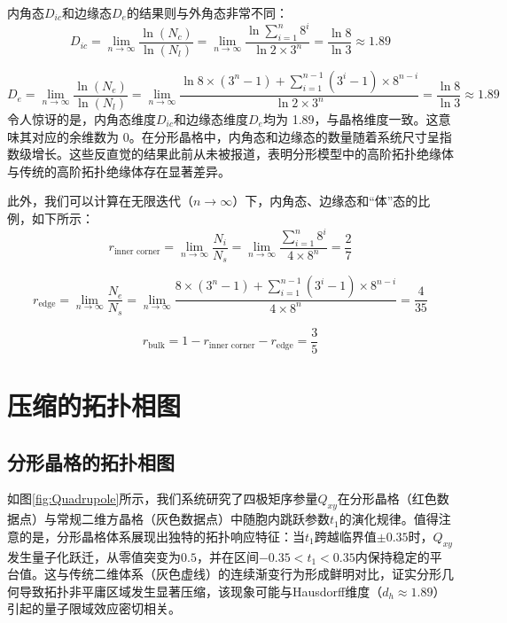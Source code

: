 内角态$D_{ic}$和边缘态$D_e$的结果则与外角态非常不同：
\begin{equation}
D_{ic}= \lim_{n \to \infty} \frac{\ln (N_c)}{\ln (N_l)} = \lim_{n \to \infty} \frac{\ln \sum_{i=1}^{n} 8^i}{\ln 2 \times 3^n} = \frac{\ln 8}{\ln 3} \approx 1.89
\end{equation}

\begin{equation}
D_e = \lim_{n \to \infty} \frac{\ln (N_e)}{\ln (N_l)} = \lim_{n \to \infty} \frac{\ln 8 \times (3^n - 1) + \sum_{i=1}^{n-1} (3^i - 1) \times 8^{n-i}}{\ln 2 \times 3^n} = \frac{\ln 8}{\ln 3} \approx 1.89
\end{equation}
令人惊讶的是，内角态维度$D_{ic}$和边缘态维度$D_e$均为 1.89，与晶格维度一致。这意味其对应的余维数为 0。在分形晶格中，内角态和边缘态的数量随着系统尺寸呈指数级增长。这些反直觉的结果此前从未被报道，表明分形模型中的高阶拓扑绝缘体与传统的高阶拓扑绝缘体存在显著差异。

此外，我们可以计算在无限迭代（\( n \to \infty \)）下，内角态、边缘态和“体”态的比例，如下所示：
\begin{equation}
r_{\text{inner corner}} = \lim_{n \to \infty} \frac{N_i}{N_s} = \lim_{n \to \infty} \frac{\sum_{i=1}^{n} 8^i}{4 \times 8^n} = \frac{2}{7}
\end{equation}

\begin{equation}
r_{\text{edge}} = \lim_{n \to \infty} \frac{N_e}{N_s} = \lim_{n \to \infty} \frac{8 \times (3^n - 1) + \sum_{i=1}^{n-1} (3^i - 1) \times 8^{n-i}}{4 \times 8^n} = \frac{4}{35}
\end{equation}

\begin{equation}
r_{\text{bulk}} = 1 - r_{\text{inner corner}} - r_{\text{edge}} = \frac{3}{5}
\end{equation}

\section{压缩的拓扑相图}
\subsection{分形晶格的拓扑相图}
如图\ref{fig:Quadrupole}所示，我们系统研究了四极矩序参量$Q_{xy}$在分形晶格（红色数据点）与常规二维方晶格（灰色数据点）中随胞内跳跃参数$t_1$的演化规律。值得注意的是，分形晶格体系展现出独特的拓扑响应特征：当$t_1$跨越临界值$\pm 0.35$时，$Q_{xy}$发生量子化跃迁，从零值突变为$0.5$，并在区间$-0.35 < t_1 < 0.35$内保持稳定的平台值。这与传统二维体系（灰色虚线）的连续渐变行为形成鲜明对比，证实分形几何导致拓扑非平庸区域发生显著压缩，该现象可能与Hausdorff维度（$d_h \approx 1.89$）引起的量子限域效应密切相关。

